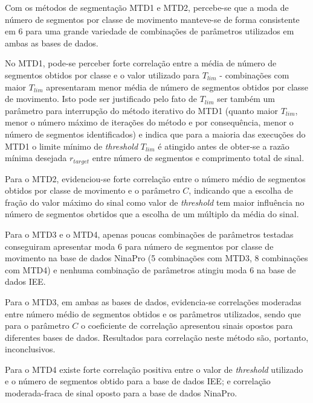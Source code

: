  

Com os métodos de segmentação MTD1 e MTD2, percebe-se que a moda de número de segmentos por classe de movimento manteve-se de forma consistente em 6 para uma grande variedade de combinações de parâmetros utilizados em ambas as bases de dados.

No MTD1, pode-se perceber forte correlação entre a média de número de segmentos obtidos por classe e o valor utilizado para $T_{lim}$ - combinações com maior $T_{lim}$ apresentaram menor média de número de segmentos obtidos por classe de movimento. Isto pode ser justificado pelo fato de $T_{lim}$ ser também um parâmetro para interrupção do método iterativo do MTD1 (quanto maior $T_{lim}$, menor o número máximo de iterações do método e por consequência, menor o número de segmentos identificados) e indica que para a maioria das execuções do MTD1 o limite mínimo de \emph{threshold} $T_{lim}$ é atingido antes de obter-se a razão mínima desejada $r_{target}$ entre número de segmentos e comprimento total de sinal.

Para o MTD2, evidenciou-se forte correlação entre o número médio de segmentos obtidos por classe de movimento e o parâmetro $C$, indicando que a escolha de fração do valor máximo do sinal como valor de \emph{threshold} tem maior influência no número de segmentos obrtidos que a escolha de um múltiplo da média do sinal.

Para o MTD3 e o MTD4, apenas poucas combinações de parâmetros testadas conseguiram apresentar moda 6 para número de segmentos por classe de movimento na base de dados NinaPro (5 combinações com MTD3, 8 combinações com MTD4) e nenhuma combinação de parâmetros atingiu moda 6 na base de dados IEE.

Para o MTD3, em ambas as bases de dados, evidencia-se correlações moderadas entre número médio de segmentos obtidos e os parâmetros utilizados, sendo que para o parâmetro $C$ o coeficiente de correlação apresentou sinais opostos para diferentes bases de dados. Resultados para correlação neste método são, portanto, inconclusivos.

Para o MTD4 existe forte correlação positiva entre o valor de \emph{threshold} utilizado e o número de segmentos obtido para a base de dados IEE; e correlação moderada-fraca de sinal oposto para a base de dados NinaPro.


